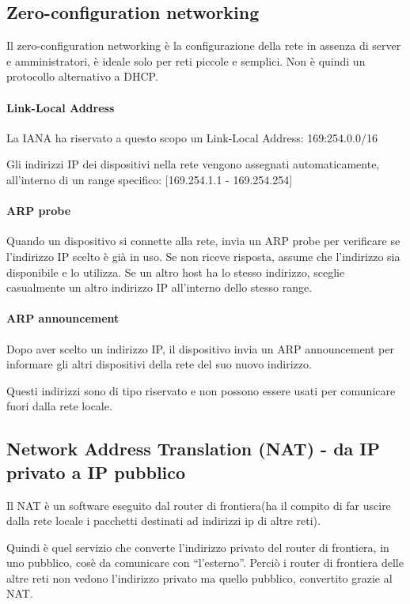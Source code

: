 \subsection{Zero-configuration networking}

Il zero-configuration networking è la configurazione della rete in assenza di server e amministratori, è ideale solo per reti piccole e semplici. Non è quindi un protocollo alternativo a DHCP.

\paragraph{Link-Local Address}
La IANA ha riservato a questo scopo un Link-Local Address: 169:254.0.0/16 

Gli indirizzi IP dei dispositivi nella rete vengono assegnati automaticamente, all'interno di un range specifico: [169.254.1.1 - 169.254.254]

\paragraph{ARP probe}
Quando un dispositivo si connette alla rete, invia un ARP probe per verificare se l'indirizzo IP scelto è già in uso. Se non riceve risposta, assume che l'indirizzo sia disponibile e lo utilizza. 
Se un altro host ha lo stesso indirizzo, sceglie casualmente un altro indirizzo IP all'interno dello stesso range.

\paragraph{ARP announcement}
Dopo aver scelto un indirizzo IP, il dispositivo invia un ARP announcement per informare gli altri dispositivi della rete del suo nuovo indirizzo. 

Questi indirizzi sono di tipo riservato e non possono essere usati per comunicare fuori dalla rete locale.



\subsection{Network Address Translation (NAT) - da IP privato a IP pubblico}


Il NAT è un software eseguito dal router di frontiera(ha il compito di far uscire dalla rete locale i pacchetti destinati ad indirizzi ip di altre reti).

Quindi è quel servizio che converte l'indirizzo privato del router di frontiera, in uno pubblico, cosè da comunicare con “l'esterno”. 
Perciò i router di frontiera delle altre reti non vedono l'indirizzo privato ma quello pubblico, convertito grazie al NAT.


